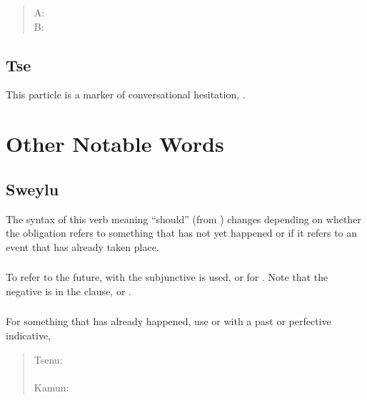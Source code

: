 \begin{quotation}
\noindent A:   \\
\noindent B:  
\end{quotation}

\subsection{Tse} This particle is a marker of conversational
hesitation, . 


\section{Other Notable Words}

\subsection{Sweylu} \label{syn:sweylu} The syntax of this verb meaning
``should'' (from  ) changes depending on
whether the obligation refers to something that has not yet happened or
if it refers to an event that has already taken place.

\subsubsection{} To refer to the future,  with the subjunctive
is used,  or  for .  Note that the negative is
in the  clause,  or  .

\subsubsection{} For something that has already happened, use 
or  with a past or perfective indicative,

\begin{quotation}
\noindent Tsenu: \\
\noindent{} \\

\noindent Kamun: \\
\noindent{}
\end{quotation}

